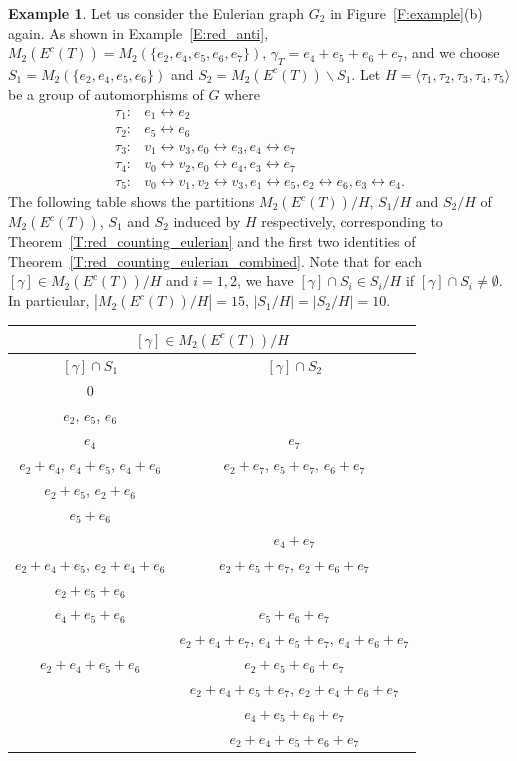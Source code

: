 \documentclass[11pt]{amsart}
\renewcommand{\setminus}{\mathbin{\backslash}}%
\theoremstyle{plain}
\theoremstyle{definition}
\newtheorem{example}[theorem]{Example}
\numberwithin{equation}{section}
\begin{document}
\begin{example}
Let us consider the Eulerian graph $G_2$  in Figure~\ref{F:example}(b) again. As shown in Example~\ref{E:red_anti}, $M_2(E^c(T))=M_2(\{e_2,e_4,e_5,e_6,e_7\})$, $\gamma_T=e_4 + e_5+ e_6 +e_7$, and we choose $S_1=M_2(\{e_2,e_4,e_5,e_6\})$ and $S_2=M_2(E^c(T) )\setminus S_1$. Let $H=\langle\tau_1,\tau_2,\tau_3,\tau_4,\tau_5\rangle$ be a group of automorphisms of $G$ where 
\begin{align*}
\tau_1: & e_1 \leftrightarrow e_2 \\
\tau_2: & e_5\leftrightarrow e_6 \\
\tau_3: & v_1\leftrightarrow v_3, e_0\leftrightarrow e_3, e_4\leftrightarrow e_7 \\
\tau_4: & v_0\leftrightarrow v_2, e_0 \leftrightarrow e_4, e_3\leftrightarrow e_7 \\
\tau_5: & v_0\leftrightarrow v_1, v_2\leftrightarrow v_3, e_1\leftrightarrow e_5,e_2\leftrightarrow e_6, e_3\leftrightarrow e_4. 
\end{align*}
The following table shows the partitions $M_2(E^c(T))/H$, $S_1/H$ and $S_2/H$  of $M_2(E^c(T))$, $S_1$ and $S_2$ induced by $H$ respectively, corresponding to Theorem~\ref{T:red_counting_eulerian} and the first two identities of Theorem~\ref{T:red_counting_eulerian_combined}. Note that for each $[\gamma]\in M_2(E^c(T))/H$ and $i=1,2$, we have $[\gamma]\cap S_i\in S_i/H$ if $[\gamma]\cap S_i\neq \emptyset$. In particular, $|M_2(E^c(T))/H|=15$, $|S_1/H|=|S_2/H|=10$.  

\begin{center}
\begin{tabular}{|c|c|}
\hline
\multicolumn{2}{|c|}{$[\gamma]\in M_2(E^c(T))/H$} \\ \hline
$[\gamma]\cap S_1$& $[\gamma]\cap S_2$   \\ \hline 
0 &  \\ \hline 
$e_2$, $e_5$, $e_6$ & \\ \hline
$e_4$   &   $e_7$   \\ \hline
$e_2+e_4$,  $e_4+e_5$, $e_4+e_6$ & $e_2+e_7$, $e_5+e_7$,  $e_6+e_7$  \\ \hline
$e_2+e_5$, $e_2+e_6$  &    \\ \hline
$e_5+e_6$ &    \\ \hline
& $e_4+e_7$    \\ \hline
$e_2+e_4+e_5$, $e_2+e_4+e_6$  & $e_2+e_5+e_7$, $e_2+e_6+e_7$ \\ \hline
$e_2+e_5+e_6$ &\\ \hline
$e_4+e_5+e_6$ & $e_5+e_6+e_7$\\ \hline
& $e_2+e_4+e_7$, $e_4+e_5+e_7$,  $e_4+e_6+e_7$\\ \hline
$e_2+e_4+e_5+e_6$ & $e_2+e_5+e_6+e_7$\\ \hline
&$e_2+e_4+e_5+e_7$, $e_2+e_4+e_6+e_7$\\ \hline
&$e_4+e_5+e_6+e_7$ \\ \hline
& $e_2+e_4+e_5+e_6+e_7$\\ \hline
\end{tabular}
\end{center}


\end{example}
\end{document}
